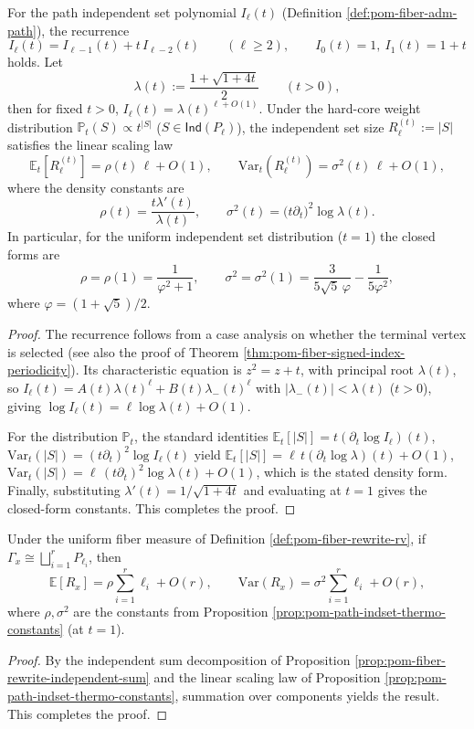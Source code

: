 \begin{proposition}\label{prop:pom-path-indset-thermo-constants}
For the path independent set polynomial \(I_{\ell}(t)\) (Definition \ref{def:pom-fiber-adm-path}), the recurrence
\[
I_{\ell}(t)=I_{\ell-1}(t)+t\,I_{\ell-2}(t)\qquad(\ell\ge 2),
\qquad
I_0(t)=1,\ I_1(t)=1+t
\]
holds. Let
\[
\lambda(t):=\frac{1+\sqrt{1+4t}}{2}\qquad(t>0),
\]
then for fixed \(t>0\), \(I_{\ell}(t)=\lambda(t)^{\ell+O(1)}\).
Under the hard-core weight distribution
\(
\mathbb P_t(S)\propto t^{|S|}
\)
(\(S\in\mathsf{Ind}(P_{\ell})\)), the independent set size \(R_{\ell}^{(t)}:=|S|\) satisfies the linear scaling law
\[
\mathbb{E}_t[R_{\ell}^{(t)}]=\rho(t)\,\ell+O(1),\qquad
\mathrm{Var}_t(R_{\ell}^{(t)})=\sigma^2(t)\,\ell+O(1),
\]
where the density constants are
\[
\rho(t)=\frac{t\lambda'(t)}{\lambda(t)},\qquad
\sigma^2(t)=\bigl(t\partial_t\bigr)^2\log\lambda(t).
\]
In particular, for the uniform independent set distribution (\(t=1\)) the closed forms are
\[
\rho=\rho(1)=\frac{1}{\varphi^2+1},
\qquad
\sigma^2=\sigma^2(1)=\frac{3}{5\sqrt5\,\varphi}-\frac{1}{5\varphi^2},
\]
where \(\varphi=(1+\sqrt5)/2\).
\end{proposition}
\begin{proof}
The recurrence follows from a case analysis on whether the terminal vertex is selected (see also the proof of Theorem \ref{thm:pom-fiber-signed-index-periodicity}).
Its characteristic equation is \(z^2=z+t\), with principal root \(\lambda(t)\), so
\(
I_{\ell}(t)=A(t)\lambda(t)^{\ell}+B(t)\lambda_-(t)^{\ell}
\)
with \(|\lambda_-(t)|<\lambda(t)\) (\(t>0\)), giving \(\log I_{\ell}(t)=\ell\log\lambda(t)+O(1)\).
\par
For the distribution \(\mathbb P_t\), the standard identities
\(
\mathbb E_t[|S|]=t(\partial_t\log I_{\ell})(t)
\),
\(
\mathrm{Var}_t(|S|)=(t\partial_t)^2\log I_{\ell}(t)
\)
yield
\(
\mathbb E_t[|S|]=\ell\,t(\partial_t\log\lambda)(t)+O(1)
\),
\(
\mathrm{Var}_t(|S|)=\ell\,(t\partial_t)^2\log\lambda(t)+O(1)
\),
which is the stated density form.
Finally, substituting \(\lambda'(t)=1/\sqrt{1+4t}\) and evaluating at \(t=1\) gives the closed-form constants. This completes the proof.
\end{proof}

\begin{corollary}\label{cor:pom-fiber-rewrite-mean-var-density}
Under the uniform fiber measure of Definition \ref{def:pom-fiber-rewrite-rv}, if \(\Gamma_x\cong\bigsqcup_{i=1}^r P_{\ell_i}\), then
\[
\mathbb E[R_x]=\rho\sum_{i=1}^r \ell_i+O(r),
\qquad
\mathrm{Var}(R_x)=\sigma^2\sum_{i=1}^r \ell_i+O(r),
\]
where \(\rho,\sigma^2\) are the constants from Proposition \ref{prop:pom-path-indset-thermo-constants} (at \(t=1\)).
\end{corollary}
\begin{proof}
By the independent sum decomposition of Proposition \ref{prop:pom-fiber-rewrite-independent-sum} and the linear scaling law of Proposition \ref{prop:pom-path-indset-thermo-constants}, summation over components yields the result. This completes the proof.
\end{proof}

